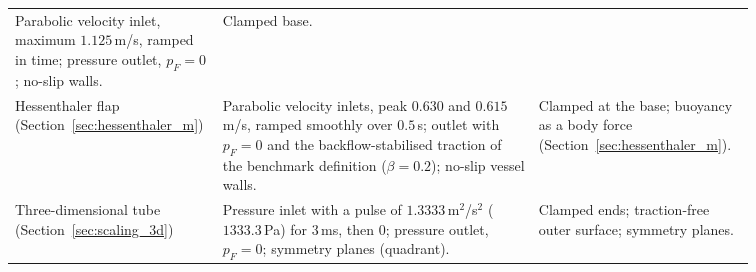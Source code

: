 \begin{table}[htbp]
\begin{tabular}{@{}p{0.17\linewidth}p{0.41\linewidth}p{0.28\linewidth}@{}}
Parabolic velocity inlet, maximum $1.125$\,m/s, ramped in time; pressure outlet, $p_F = 0$; no-slip walls. &
Clamped base. \\
Hessenthaler flap (Section~\ref{sec:hessenthaler_m}) &
Parabolic velocity inlets, peak $0.630$ and $0.615$\,m/s, ramped smoothly over $0.5$\,s; outlet with $p_F = 0$ and the backflow-stabilised traction of the benchmark definition ($\beta = 0.2$); no-slip vessel walls. &
Clamped at the base; buoyancy as a body force (Section~\ref{sec:hessenthaler_m}). \\
Three-dimensional tube (Section~\ref{sec:scaling_3d}) &
Pressure inlet with a pulse of $1.3333$\,m$^2$/s$^2$ ($1333.3$\,Pa) for $3$\,ms, then $0$; pressure outlet, $p_F = 0$; symmetry planes (quadrant). &
Clamped ends; traction-free outer surface; symmetry planes. \\
\bottomrule
\end{tabular}
\end{table}
